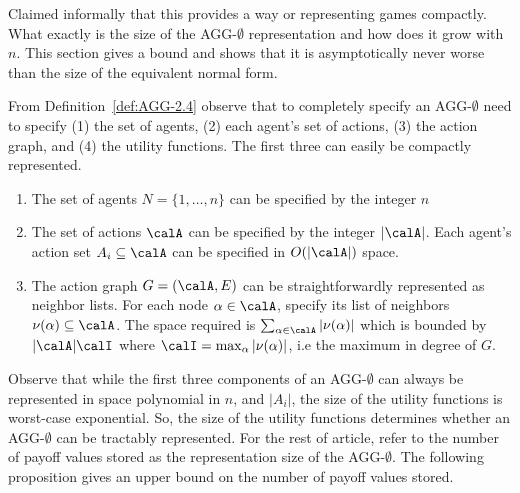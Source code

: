 Claimed informally that this provides a way or representing games compactly. What exactly is the size of the AGG-\(\emptyset\) representation and how does it grow with $n$. This section gives a bound and shows that it is asymptotically never worse than the size of the equivalent normal form. 

From Definition~\ref{def:AGG-2.4} observe that to completely specify an AGG-\(\emptyset\) need to specify (1) the set of agents, (2) each agent's set of actions, (3) the action graph, and (4) the utility functions. The first three can easily be compactly represented. 
\begin{enumerate}
	\item The set of agents $N = \{1, \dots, n\}$ can be specified by the integer $n$
	\item The set of actions $\calA$ can be specified by the integer $|\calA|$. Each agent's action set $A_i \subseteq \calA$ can be specified in $O(|\calA|)$ space. 
	\item The action graph $G = (\calA, E)$ can be straightforwardly represented as neighbor lists. For each node $\alpha \in \calA$, specify its list of neighbors $\nu(\alpha) \subseteq \calA$. The space required is $\sum_{\alpha \in \calA} |\nu(\alpha)|$ which is bounded by $|\calA|\calI$ where $\calI = \max_\alpha|\nu(\alpha)|$, i.e the maximum in degree of $G$.
\end{enumerate}
Observe that while the first three components of an AGG-\(\emptyset\) can always be represented in space polynomial in $n$, and $|A_i|$, the size of the utility functions is worst-case exponential. So, the size of the utility functions determines whether an AGG-\(\emptyset\) can be tractably represented. For the rest of article, refer to the number of payoff values stored as the representation size of the AGG-\(\emptyset\). The following proposition gives an upper bound on the number of payoff values stored. 

